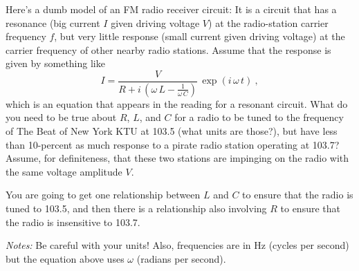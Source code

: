 \documentclass[12pt]{article}
\begin{document}
\startproblem%
Here's a dumb model of an FM radio receiver circuit: It is a circuit that has a
resonance (big current $I$ given driving voltage $V$) at the radio-station
carrier frequency $f$, but very little response (small current given
driving voltage) at the carrier frequency of other nearby radio stations.
Assume that the response is given by something like
\begin{equation}\label{eq:res}
  I = \frac{V}{R + i\,\left(\omega\,L - \frac{1}{\omega\,C}\right)}\,\exp(i\,\omega\,t) ~,
\end{equation}
which is an equation that appears in the reading for a resonant circuit.
What do you need to be true about $R$, $L$,
and $C$ for a radio to be tuned to the frequency of The Beat of New
York KTU at 103.5 (what units are those?),
but have less than 10-percent as much
response to a pirate radio station operating at 103.7? Assume, for
definiteness, that these two stations are impinging on the radio with
the same voltage amplitude $V$.

You are going to get one relationship between $L$ and
$C$ to ensure that the radio is tuned to 103.5, and then there is a
relationship also involving $R$ to ensure that the radio is
insensitive to 103.7.

\textsl{Notes:} Be careful with your units! Also, frequencies are in Hz
(cycles per second) but the equation above uses $\omega$ (radians per second).
\end{document}
